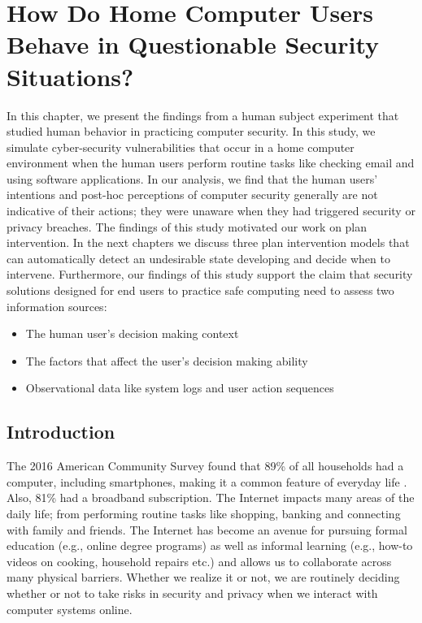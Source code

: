 \chapter{How Do Home Computer Users Behave in Questionable Security Situations?}
\label{chap:ch3}
In this chapter, we present the findings from a human subject experiment that studied human behavior in practicing computer security.
In this study, we simulate cyber-security vulnerabilities that occur in a home computer environment when the human users perform routine tasks like checking email and using software applications. 
In our analysis, we find that the human users' intentions and post-hoc perceptions of computer security generally are not indicative of their actions; they were unaware when they had triggered security or privacy breaches.
The findings of this study motivated our work on plan intervention. 
In the next chapters we discuss three plan intervention models that can automatically detect an undesirable state developing and decide when to intervene.
Furthermore, our findings of this study support the claim that security solutions designed for end users to practice safe computing need to assess two information sources: 
\begin{itemize}
\item The human user's decision making context 
\item The factors that affect the user's decision making ability
\item Observational data like system logs and user action sequences
\end{itemize}

\section{Introduction}
The 2016 American Community Survey found that 89\% of all households had a computer, including smartphones, making it a common feature of everyday life \cite{ryan2016}. 
Also, 81\% had a broadband subscription. 
The Internet impacts many areas of the daily life; from performing routine tasks like shopping, banking and connecting with family and friends. 
The Internet has become an avenue for pursuing formal education (e.g., online degree programs) as well as informal learning (e.g., how-to videos on cooking, household repairs etc.) and allows us to collaborate across many physical barriers. 
Whether we realize it or not, we are routinely  deciding whether or not to take risks in security and privacy when we interact with computer systems online.

